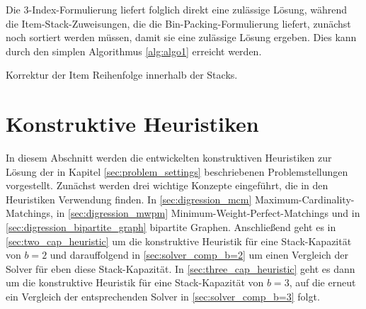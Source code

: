 Die 3-Index-Formulierung liefert folglich direkt eine zulässige Lösung, während die Item-Stack-Zuweisungen, die die Bin-Packing-Formulierung liefert, zunächst noch sortiert werden müssen, damit sie eine zulässige Lösung ergeben. Dies kann durch den simplen Algorithmus \ref{alg:algo1} erreicht werden.

\begin{algorithm}
\fontsize{10pt}{10pt}

\SetAlgoLined


\caption{Korrektur der Item Reihenfolge innerhalb der Stacks.}
\label{alg:algo1}
\end{algorithm}

\pagebreak

\section{Konstruktive Heuristiken}
\label{sec:constructive_heuristics}

In diesem Abschnitt werden die entwickelten konstruktiven Heuristiken zur Lösung der in Kapitel \ref{sec:problem_settings}
beschriebenen Problemstellungen vorgestellt.
Zunächst werden drei wichtige Konzepte eingeführt, die in den Heuristiken Verwendung finden.
In \ref{sec:digression_mcm} Maximum-Cardinality-Matchings,
in \ref{sec:digression_mwpm} Minimum-Weight-Perfect-Matchings und in \ref{sec:digression_bipartite_graph}
bipartite Graphen. Anschließend geht es in \ref{sec:two_cap_heuristic} um die konstruktive Heuristik für eine Stack-Kapazität
von $b=2$ und darauffolgend in \ref{sec:solver_comp_b=2} um einen Vergleich der Solver für eben diese Stack-Kapazität.
In \ref{sec:three_cap_heuristic} geht es dann um die konstruktive Heuristik für eine Stack-Kapazität von $b=3$, auf
die erneut ein Vergleich der entsprechenden Solver in \ref{sec:solver_comp_b=3} folgt.


